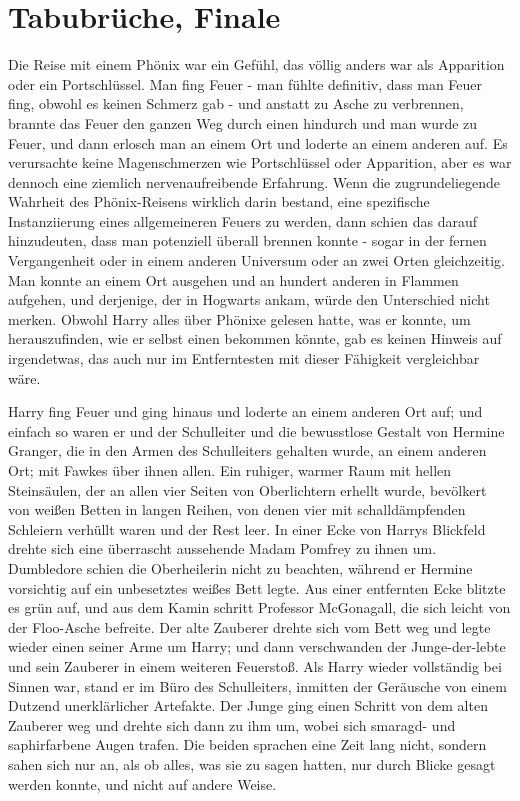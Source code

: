 \chapter{Tabubrüche, Finale}

Die Reise mit einem Phönix war ein Gefühl, das völlig anders war als Apparition
oder ein Portschlüssel. Man fing Feuer - man fühlte definitiv, dass man Feuer
fing, obwohl es keinen Schmerz gab - und anstatt zu Asche zu verbrennen, brannte
das Feuer den ganzen Weg durch einen hindurch und man wurde zu Feuer, und dann
erlosch man an einem Ort und loderte an einem anderen auf. Es verursachte keine
Magenschmerzen wie Portschlüssel oder Apparition, aber es war dennoch eine
ziemlich nervenaufreibende Erfahrung. Wenn die zugrundeliegende Wahrheit des
Phönix-Reisens wirklich darin bestand, eine spezifische Instanziierung eines
allgemeineren Feuers zu werden, dann schien das darauf hinzudeuten, dass man
potenziell überall brennen konnte - sogar in der fernen Vergangenheit oder in
einem anderen Universum oder an zwei Orten gleichzeitig. Man konnte an einem Ort
ausgehen und an hundert anderen in Flammen aufgehen, und derjenige, der in
Hogwarts ankam, würde den Unterschied nicht merken. Obwohl Harry alles über
Phönixe gelesen hatte, was er konnte, um herauszufinden, wie er selbst einen
bekommen könnte, gab es keinen Hinweis auf irgendetwas, das auch nur im
Entferntesten mit dieser Fähigkeit vergleichbar wäre.

Harry fing Feuer und ging hinaus und loderte an einem anderen Ort auf; und
einfach so waren er und der Schulleiter und die bewusstlose Gestalt von Hermine
Granger, die in den Armen des Schulleiters gehalten wurde, an einem anderen Ort;
mit Fawkes über ihnen allen. Ein ruhiger, warmer Raum mit hellen Steinsäulen,
der an allen vier Seiten von Oberlichtern erhellt wurde, bevölkert von weißen
Betten in langen Reihen, von denen vier mit schalldämpfenden Schleiern verhüllt
waren und der Rest leer. In einer Ecke von Harrys Blickfeld drehte sich eine
überrascht aussehende Madam Pomfrey zu ihnen um. Dumbledore schien die
Oberheilerin nicht zu beachten, während er Hermine vorsichtig auf ein
unbesetztes weißes Bett legte. Aus einer entfernten Ecke blitzte es grün auf,
und aus dem Kamin schritt Professor McGonagall, die sich leicht von der
Floo-Asche befreite. Der alte Zauberer drehte sich vom Bett weg und legte wieder
einen seiner Arme um Harry; und dann verschwanden der Junge-der-lebte und sein
Zauberer in einem weiteren Feuerstoß. Als Harry wieder vollständig bei Sinnen
war, stand er im Büro des Schulleiters, inmitten der Geräusche von einem Dutzend
unerklärlicher Artefakte. Der Junge ging einen Schritt von dem alten Zauberer
weg und drehte sich dann zu ihm um, wobei sich smaragd- und saphirfarbene Augen
trafen. Die beiden sprachen eine Zeit lang nicht, sondern sahen sich nur an, als
ob alles, was sie zu sagen hatten, nur durch Blicke gesagt werden konnte, und
nicht auf andere Weise.

